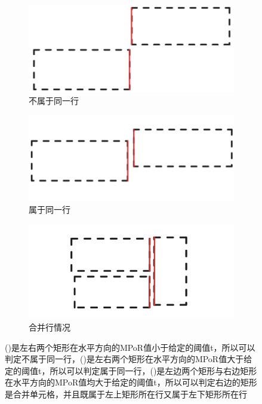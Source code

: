 \documentclass[number, UTF8,12pt, AutoFakeBold,fontset = founder]{ctexart}
\begin{document}
\begin{figure}[H]
    \centering
    \begin{subfigure}[b]{0.3\textwidth}
        \includegraphics[width=\textwidth]{../images/a.png}
        \caption{不属于同一行}
        \label{fig:a}
    \end{subfigure}
    \hfill
    \begin{subfigure}[b]{0.3\textwidth}
        \includegraphics[width=\textwidth]{../images/b.png}
        \caption{属于同一行}
        \label{fig:b}
    \end{subfigure}
    \hfill
    \begin{subfigure}[b]{0.3\textwidth}
        \includegraphics[width=\textwidth]{../images/c.png}
        \caption{合并行情况}
        \label{fig:c}
    \end{subfigure}
    \captionsetup{labelsep=colon} 
    \caption{()是左右两个矩形在水平方向的MPoR值小于给定的阈值t，所以可以判定不属于同一行，()是左右两个矩形在水平方向的MPoR值大于给定的阈值t，所以可以判定属于同一行，()是左边两个矩形与右边矩形在水平方向的MPoR值均大于给定的阈值t，所以可以判定右边的矩形是合并单元格，并且既属于左上矩形所在行又属于左下矩形所在行}
\end{figure}
\end{document}
